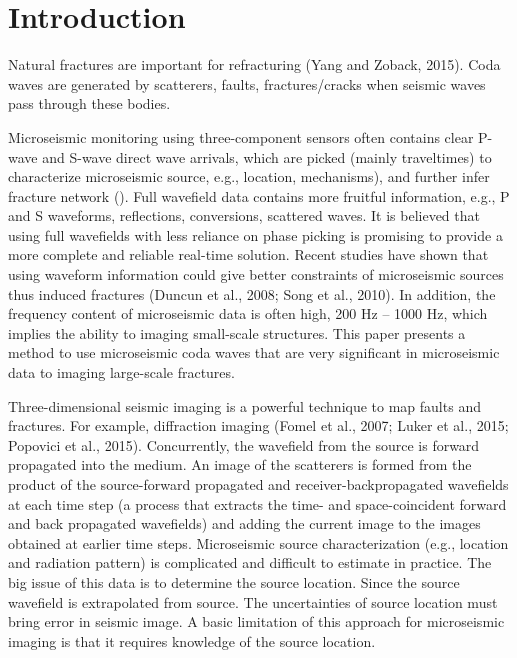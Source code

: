 \section{Introduction}
Natural fractures are important for refracturing (Yang and Zoback, 2015). Coda waves are generated by scatterers, faults, fractures/cracks when seismic waves pass through these bodies. 

Microseismic monitoring using three-component sensors often contains clear P-wave and S-wave direct wave arrivals, which are picked (mainly traveltimes) to characterize microseismic source, e.g., location, mechanisms), and further infer fracture network (). Full wavefield data contains more fruitful information, e.g., P and S waveforms, reflections, conversions, scattered waves. It is believed that using full wavefields with less reliance on phase picking is promising to provide a more complete and reliable real-time solution. Recent studies have shown that using waveform information could give better constraints of microseismic sources thus induced fractures (Duncun et al., 2008; Song et al., 2010). In addition, the frequency content of microseismic data is often high, 200 Hz – 1000 Hz, which implies the ability to imaging small-scale structures. This paper presents a method to use microseismic coda waves that are very significant in microseismic data to imaging large-scale fractures. 

Three-dimensional seismic imaging is a powerful technique to map faults and fractures. For example, diffraction imaging (Fomel et al., 2007; Luker et al., 2015; Popovici et al., 2015). Concurrently, the wavefield from the source is forward propagated into the medium. An image of the scatterers is formed from the product of the source-forward propagated and receiver-backpropagated wavefields at each time step (a process that extracts the time- and space-coincident forward and back propagated wavefields) and adding the current image to the images obtained at earlier time steps. Microseismic source characterization (e.g., location and radiation pattern) is complicated and difficult to estimate in practice. The big issue of this data is to determine the source location. Since the source wavefield is extrapolated from source. The uncertainties of source location must bring error in seismic image. A basic limitation of this approach for microseismic imaging is that it requires knowledge of the source location. 

